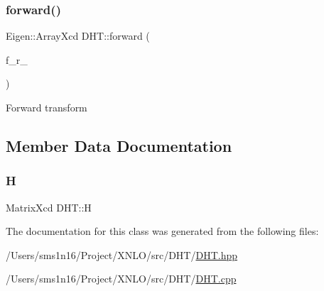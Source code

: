 \subsubsection{\texorpdfstring{forward()}{forward()}}
{\footnotesize\ttfamily Eigen\+::\+Array\+Xcd D\+H\+T\+::forward (\begin{DoxyParamCaption}\item[{Eigen\+::\+Array\+Xcd}]{f\+\_\+r\+\_\+ }\end{DoxyParamCaption})}

Forward transform 

\subsection{Member Data Documentation}
\mbox{\label{class_d_h_t_ac17a580b606f25c937dbdc81dba517d7}} 
\subsubsection{\texorpdfstring{H}{H}}
{\footnotesize\ttfamily Matrix\+Xcd D\+H\+T\+::H}



The documentation for this class was generated from the following files\+:\begin{DoxyCompactItemize}
\item 
/\+Users/sms1n16/\+Project/\+X\+N\+L\+O/src/\+D\+H\+T/\mbox{\hyperlink{_d_h_t_8hpp}{D\+H\+T.\+hpp}}\item 
/\+Users/sms1n16/\+Project/\+X\+N\+L\+O/src/\+D\+H\+T/\mbox{\hyperlink{_d_h_t_8cpp}{D\+H\+T.\+cpp}}\end{DoxyCompactItemize}
